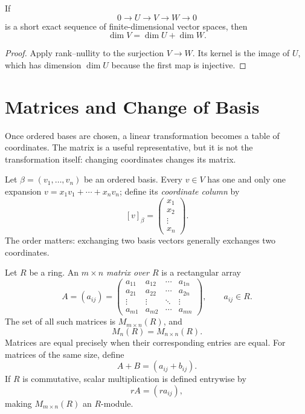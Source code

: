\begin{corollary}\label{cor:short-exact-dimension}
If
\[
0\longrightarrow U\longrightarrow V\longrightarrow W\longrightarrow0
\]
is a short exact sequence of finite-dimensional vector spaces, then
\[
\dim V=\dim U+\dim W.
\]
\end{corollary}
\begin{proof}
Apply rank--nullity to the surjection \(V\to W\).  Its kernel is the image
of \(U\), which has dimension \(\dim U\) because the first map is injective.
\end{proof}

\section{Matrices and Change of Basis}\label{sec:matrices-change-basis}
Once ordered bases are chosen, a linear transformation becomes a table of
coordinates. The matrix is a useful representative, but it is not the
transformation itself: changing coordinates changes its matrix.

Let \(\beta=(v_1,\ldots,v_n)\) be an ordered basis. Every \(v\in V\) has
one and only one expansion \(v=x_1v_1+\cdots+x_nv_n\); define its
\emph{coordinate column} by
\[
[v]_\beta=\begin{pmatrix}x_1\\x_2\\\vdots\\x_n\end{pmatrix}.
\]
The order matters: exchanging two basis vectors generally exchanges two
coordinates.

\begin{definition}
Let \(R\) be a ring. An \emph{\(m\times n\) matrix over \(R\)} is a
rectangular array
\[
A=(a_{ij})=
\begin{pmatrix}
a_{11}&a_{12}&\cdots&a_{1n}\\
a_{21}&a_{22}&\cdots&a_{2n}\\
\vdots&\vdots&\ddots&\vdots\\
a_{m1}&a_{m2}&\cdots&a_{mn}
\end{pmatrix},
\qquad
a_{ij}\in R.
\]
The set of all such matrices is \(M_{m\times n}(R)\), and
\[
M_n(R)=M_{n\times n}(R).
\]
Matrices are equal precisely when their corresponding entries are equal. For
matrices of the same size, define
\[
A+B=(a_{ij}+b_{ij}).
\]
If \(R\) is commutative, scalar multiplication is defined entrywise by
\[
rA=(ra_{ij}),
\]
making \(M_{m\times n}(R)\) an \(R\)-module.
\end{definition}

